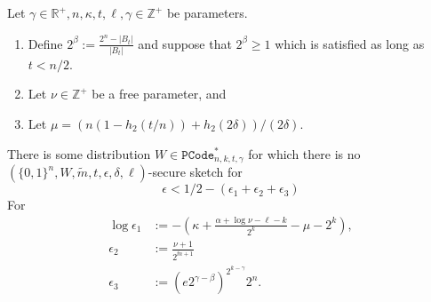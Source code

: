 \begin{theorem}
Let $\gamma \in\mathbb{R}^+, n, \kappa, t, \ell, \gamma \in\mathbb{Z}^+$ be parameters.
\begin{enumerate}
\itemsep0em
\item Define $2^\beta:=\frac{2^n-|B_t|}{|B_t|}$ and suppose that $2^\beta\ge 1$ which is satisfied as long as $t< n/2 $. 
\item Let $\nu \in \mathbb{Z}^+$ be a free parameter, and
\item Let $\mu =(n(1-h_2(t/n)) +h_2(2\delta))/(2\delta)$.
\end{enumerate}
There is some distribution $W\in \mathtt{PCode}_{n, k, t, \gamma}^{*}$ for which there is no $(\{0,1\}^n, W, \tilde{m}, t, \epsilon,\delta, \ell)$-secure sketch for 
\[
\epsilon< 1/2 - (\epsilon_1+\epsilon_2+\epsilon_3)
\]
For 
\begin{align*}\log{\epsilon_1}&:= -\left(\kappa+\frac{\alpha +\log{\nu}-\ell-k}{2^k} - \mu -2^k\right),\\
\epsilon_2&:=\frac{\nu+1}{2^{\tilde{m}+1}}\\
\epsilon_3&:=\left(e2^{\gamma-\beta}\right)^{2^{k-\gamma}}2^n.
\end{align*}
\label{thm:main theorem ss}
\end{theorem}

